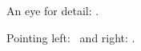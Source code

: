 \documentclass{article}
\begin{document}
An eye for detail: \eye.

Pointing left: \leftpointright\ and right: \rightpointleft.
\end{document}
